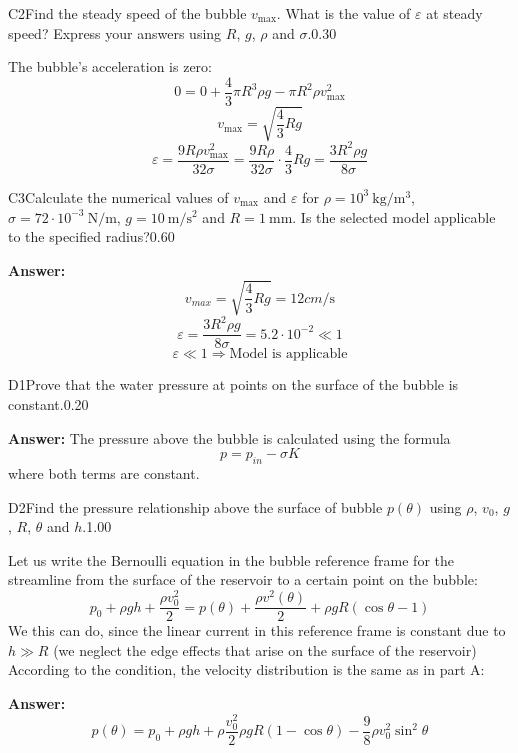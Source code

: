 \documentclass[11pt,a4paper]{article}
\begin{document}
\begin{solcard}{C2}{Find the steady speed of the bubble $v_{\max}$. What is the value of $\varepsilon$ at steady speed? Express your answers using $R$, $g$, $\rho$ and $\sigma$.}{0.30}

The bubble's acceleration is zero: $$0 = 0 + \frac{4}{3}\pi R^3 \rho g - \pi R^2 \rho v_{\max}^2$$$$v_{\max} = \sqrt{\frac{4}{3}Rg}$$$$ \varepsilon   = \frac{9R\rho v_{\max}^2}{32\sigma} = \frac{9R\rho }{32\sigma} \cdot \frac{4}{3}Rg = \frac{3R^2 \rho g}{8\sigma}$$

\end{solcard}

\begin{solcard}{C3}{Calculate the numerical values of $v_{\max}$ and $\varepsilon$ for $\rho = 10^3~ {\text{kg}}/{\text{m}^3}$, $\sigma = 72 \cdot 10^{-3} ~\text{N}/\text{m}$, $g =10 ~\text{m}/ \text{s}^{2}$ and $R = 1~\text{mm}$. Is the selected model applicable to the specified radius?}{0.60}
\par\smallskip\noindent\textbf{Answer:} $$v_{max} = \sqrt{\frac{4}{3}Rg} = 12 cm/\mathrm{s}$$$$\varepsilon = \dfrac{3R^2\rho g}{8\sigma} = 5.2 \cdot 10^{-2} \ll 1$$$$\varepsilon \ll 1 \Rightarrow \text{Model is applicable}$$
\end{solcard}

\begin{solcard}{D1}{Prove that the water pressure at points on the surface of the bubble is constant.}{0.20}
\par\smallskip\noindent\textbf{Answer:} The pressure above the bubble is calculated using the formula $$p  = p_{in} - \sigma K$$ where both terms are constant.
\end{solcard}

\begin{solcard}{D2}{Find the pressure relationship above the surface of bubble $p(\theta)$ using $\rho$, $v_0$, $g$, $R$, $\theta$ and $h$.}{1.00}

Let us write the Bernoulli equation in the bubble reference frame for the streamline from the surface of the reservoir to a certain point on the bubble: $$p_0 + \rho g h + \frac{\rho v_0^2}{2} = p(\theta) + \frac{\rho v^2(\theta)}{2} + \rho g R(\cos{\theta} - 1)$$We this can do, since the linear current in this reference frame is constant due to $h \gg R$ (we neglect the edge effects that arise on the surface of the reservoir) According to the condition, the velocity distribution is the same as in part A:

\par\smallskip\noindent\textbf{Answer:} $$p(\theta) = p_0 +\rho g h + \rho \frac{v_0^2}{2} \rho g R(1 - \cos{\theta}) -  \frac{9}{8}\rho v_0^2 \sin^2{\theta}$$
\end{solcard}
\end{document}
